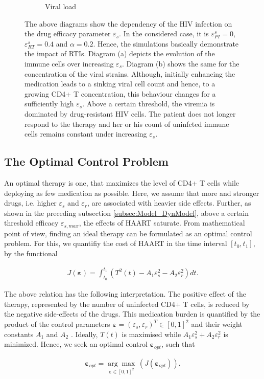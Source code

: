 \begin{figure}
\begin{subfigure}[b]{0.475\textwidth}
        \caption[]%
        {{\small Viral load}}    
        \label{fig3c:viral_load}
    \end{subfigure}
    \caption[]{The above diagrams show the dependency of the HIV infection on the drug efficacy parameter $\varepsilon_s$.
    In the considered case, it is $\varepsilon_{PI}^s =0$, $\varepsilon_{RT}^s = 0.4$ and $\alpha = 0.2$.
    Hence, the simulations basically demonstrate the impact of RTIs.
    Diagram (a) depicts the evolution of the immune cells over increasing $\varepsilon_s$. 
    Diagram (b) shows the same for the concentration of the viral strains.
    Although, initially enhancing the medication leads to a sinking viral cell count and hence, to a growing CD4+ T concentration, this behaviour changes for a sufficiently high $\varepsilon_s$.
    Above a certain threshold, the viremia is dominated by drug-resistant HIV cells. The patient does not longer respond to the therapy and her or his count of uninfcted immune cells remains constant under increasing $\varepsilon_s$.}
    \label{fig3:evolution_over_epsilon}
\end{figure}

\subsection{The Optimal Control Problem}
\label{subsec:Model_OptControl}

An optimal therapy is one, that maximizes the level of CD4+ T cells while deploying as few medication as possible.
Here, we assume that more and stronger drugs, i.e. higher $\varepsilon_s$ and $\varepsilon_r$, are associated with heavier 
side effects. 
Further, as shown in the preceding subsection \ref{subsec:Model_DynModel}, above a certain threshold efficacy $\varepsilon_{s,max}$, the effects of 
HAART saturate.\newline
From mathematical point of view, finding an ideal therapy can be formulated as an optimal control problem.
For this, we quantifiy the cost of HAART in the time interval $[t_0,t_1]$, by the functional

\begin{align}
    J(\mathbf{\varepsilon}) = \int_{t_0}^{t_1} \left(T^2(t) - A_1 \varepsilon_{s}^2 - A_2 \varepsilon_{r}^2\right) dt .
    \label{equ:cost_function}
\end{align}

The above relation has the following interpretation. 
The positive effect of the therapy, represented by the number of uninfected CD4+ T cells, is reduced by the negative side-effects of the drugs.
This medication burden is quantified by the product of the control parameters $\mathbf{\varepsilon} = (\varepsilon_s, \varepsilon_r)^T \in [0,1]^2$ and their weight constants $A_1$ and $A_2$ \cite{adams2005hiv,wu2010game}.
Ideally, $T(t)$ is maximised while $A_1 \varepsilon_{s}^2 + A_2 \varepsilon_{r}^2$ is minimized.
Hence, we seek an optimal control $\mathbf{\varepsilon}_{opt}$, such that

\begin{align}
    \mathbf{\varepsilon}_{opt} = \underset{\mathbf{\varepsilon} \in [0,1]^2}{\arg\max}\, (J(\mathbf{\varepsilon}_{opt})) \text{.}
    \label{equ:opti_control}
\end{align}
